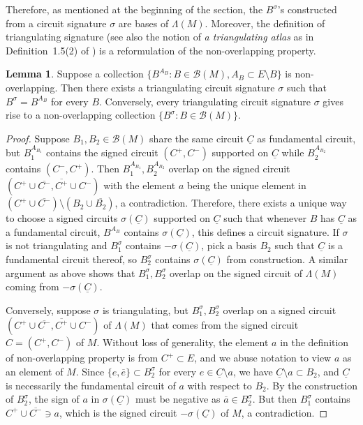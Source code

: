 \documentclass[12pt]{amsart}
\numberwithin{equation}{section}
\theoremstyle{definition}
\newtheorem{lemma}[theorem]{Lemma}
\newcommand{\Bcal}{{\mathcal B}}
\begin{document}
Therefore, as mentioned at the beginning of the section, the $B^\sigma$'s constructed from a circuit signature $\sigma$ are bases of $\Lambda(M)$.
Moreover, the definition of triangulating signature (see also the notion of {\em a triangulating atlas} as in Definition~1.5(2) of \cite{Ding_GB2}) is a reformulation of the non-overlapping property.

\begin{lemma} \label{lem:nonOC_eq_tri}
Suppose a collection $\{B^{A_B}:B\in\Bcal(M), A_B\subset E\setminus B\}$ is non-overlapping.
Then there exists a triangulating circuit signature $\sigma$ such that $B^\sigma=B^{A_B}$ for every $B$.
Conversely, every triangulating circuit signature $\sigma$ gives rise to a non-overlapping collection $\{B^\sigma:B\in\Bcal(M)\}$.
\end{lemma}

\begin{proof}
Suppose $B_1,B_2\in\Bcal(M)$ share the same circuit $\underline{C}$ as fundamental circuit, but $B_1^{A_{B_1}}$ contains the signed circuit $(C^+,C^-)$ supported on $\underline{C}$ while $B_2^{A_{B_2}}$ contains $(C^-,C^+)$.
Then $B_1^{A_{B_1}},B_2^{A_{B_2}}$ overlap on the signed circuit $(C^+\cup\overline{C^-},\overline{C^+}\cup C^-)$ with the element $a$ being the unique element in $(C^+\cup\overline{C^-})\setminus (B_2\cup\overline{B_2})$, a contradiction.
Therefore, there exists a unique way to choose a signed circuits $\sigma(\underline{C})$ supported on $\underline{C}$ such that whenever $B$ has $\underline{C}$ as a fundamental circuit, $B^{A_B}$ contains $\sigma(\underline{C})$, this defines a circuit signature.
If $\sigma$ is not triangulating and $B_1^\sigma$ contains $-\sigma(\underline{C})$, pick a basis $B_2$ such that $\underline{C}$ is a fundamental circuit thereof, so $B_2^\sigma$ contains $\sigma(\underline{C})$ from construction.
A similar argument as above shows that $B_1^\sigma,B_2^\sigma$ overlap on the signed circuit of $\Lambda(M)$ coming from $-\sigma(\underline{C})$.

Conversely, suppose $\sigma$ is triangulating, but $B_1^\sigma, B_2^\sigma$ overlap on a signed circuit $(C^+\cup\overline{C^-},\overline{C^+}\cup C^-)$ of $\Lambda(M)$ that comes from the signed circuit $C=(C^+,C^-)$ of $M$.
Without loss of generality, the element $a$ in the definition of non-overlapping property is from $C^+\subset E$, and we abuse notation to view $a$ as an element of $M$.
Since $\{e,\overline{e}\}\subset B_2^\sigma$ for every $e\in \underline{C}\setminus a$, we have $\underline{C}\setminus a\subset B_2$, and $\underline{C}$ is necessarily the fundamental circuit of $a$ with respect to $B_2$.
By the construction of $B_2^\sigma$, the sign of $a$ in $\sigma(\underline{C})$ must be negative as $\overline{a}\in B_2^\sigma$.
But then $B_1^\sigma$ contains $C^+\cup\overline{C^-}\ni a$, which is the signed circuit $-\sigma(\underline{C})$ of $M$, a contradiction.
\end{proof}
\end{document}
